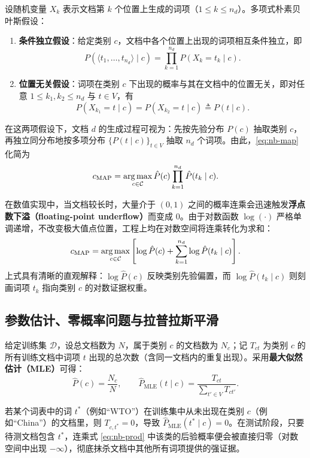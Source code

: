 \begin{definition}[多项式朴素贝叶斯的独立性假设]\label{def:nb-assumptions}
设随机变量 $X_k$ 表示文档第 $k$ 个位置上生成的词项（$1\le k\le n_d$）。多项式朴素贝叶斯假设：
\begin{enumerate}
  \item \textbf{条件独立假设}：给定类别 $c$，文档中各个位置上出现的词项相互条件独立，即
  \[
    P(\langle t_1, \dots, t_{n_d}\rangle \mid c) = \prod_{k=1}^{n_d} P(X_k = t_k \mid c).
  \]
  \item \textbf{位置无关假设}：词项在类别 $c$ 下出现的概率与其在文档中的位置无关，即对任意 $1\le k_1, k_2\le n_d$ 与 $t\in V$，有
  \[
    P(X_{k_1} = t \mid c) = P(X_{k_2} = t \mid c) \triangleq P(t \mid c).
  \]
\end{enumerate}
\end{definition}

在这两项假设下，文档 $d$ 的生成过程可视为：先按先验分布 $P(c)$ 抽取类别 $c$，再独立同分布地按多项分布 $\{P(t\mid c)\}_{t\in V}$ 抽取 $n_d$ 个词项。由此，\cref{eq:nb-map} 化简为
\begin{equation}\label{eq:nb-prod}
c_{\mathrm{MAP}} = \operatorname*{arg\,max}_{c\in\mathcal{C}} \hat{P}(c)\prod_{k=1}^{n_d}\hat{P}(t_k\mid c).
\end{equation}

在数值实现中，当文档较长时，大量介于 $(0,1)$ 之间的概率连乘会迅速触发\textbf{浮点数下溢（floating-point underflow）}而变成 $0$。由于对数函数 $\log(\cdot)$ 严格单调递增，不改变极大值点位置，工程上均在对数空间将连乘转化为求和：
\begin{equation}\label{eq:nb-log}
c_{\mathrm{MAP}} = \operatorname*{arg\,max}_{c\in\mathcal{C}} \left[ \log \hat{P}(c) + \sum_{k=1}^{n_d} \log \hat{P}(t_k\mid c) \right].
\end{equation}
上式具有清晰的直观解释：$\log\hat{P}(c)$ 反映类别先验偏置，而 $\log\hat{P}(t_k\mid c)$ 则刻画词项 $t_k$ 指向类别 $c$ 的对数证据权重。

\subsection{参数估计、零概率问题与拉普拉斯平滑}

给定训练集 $\mathcal{D}$，设总文档数为 $N$，属于类别 $c$ 的文档数为 $N_c$；记 $T_{ct}$ 为类别 $c$ 的所有训练文档中词项 $t$ 出现的总次数（含同一文档内的重复出现）。采用\textbf{最大似然估计（MLE）}可得：
\[
\hat{P}(c) = \frac{N_c}{N}, \qquad
\hat{P}_{\mathrm{MLE}}(t\mid c) = \frac{T_{ct}}{\sum_{t'\in V} T_{ct'}}.
\]

\begin{pitfall}[最大似然估计中的零概率陷阱]\label{pit:nb-zero}
若某个词表中的词 $t^*$（例如“WTO”）在训练集中从未出现在类别 $c$（例如“China”）的文档里，则 $T_{c,t^*}=0$，导致 $\hat{P}_{\mathrm{MLE}}(t^*\mid c)=0$。在测试阶段，只要待测文档包含 $t^*$，连乘式 \cref{eq:nb-prod} 中该类的后验概率便会被直接归零（对数空间中出现 $-\infty$），彻底抹杀文档中其他所有词项提供的强证据。
\end{pitfall}

